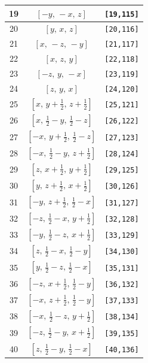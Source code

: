 \documentclass[fleqn,8pt]{jsarticle}
\begin{document}
\begin{longtable}{ccc}
19 & $\left[ - y,\, - x,\, z \right]$ & {\tt [19,115]} \\ \hline
20 & $\left[ y,\, x,\, z \right]$ & {\tt [20,116]} \\ \hline
21 & $\left[ x,\, - z,\, - y \right]$ & {\tt [21,117]} \\ \hline
22 & $\left[ x,\, z,\, y \right]$ & {\tt [22,118]} \\ \hline
23 & $\left[ - z,\, y,\, - x \right]$ & {\tt [23,119]} \\ \hline
24 & $\left[ z,\, y,\, x \right]$ & {\tt [24,120]} \\ \hline
25 & $\left[ x,\, y + \frac{1}{2},\, z + \frac{1}{2} \right]$ & {\tt [25,121]} \\ \hline
26 & $\left[ x,\, \frac{1}{2} - y,\, \frac{1}{2} - z \right]$ & {\tt [26,122]} \\ \hline
27 & $\left[ - x,\, y + \frac{1}{2},\, \frac{1}{2} - z \right]$ & {\tt [27,123]} \\ \hline
28 & $\left[ - x,\, \frac{1}{2} - y,\, z + \frac{1}{2} \right]$ & {\tt [28,124]} \\ \hline
29 & $\left[ z,\, x + \frac{1}{2},\, y + \frac{1}{2} \right]$ & {\tt [29,125]} \\ \hline
30 & $\left[ y,\, z + \frac{1}{2},\, x + \frac{1}{2} \right]$ & {\tt [30,126]} \\ \hline
31 & $\left[ - y,\, z + \frac{1}{2},\, \frac{1}{2} - x \right]$ & {\tt [31,127]} \\ \hline
32 & $\left[ - z,\, \frac{1}{2} - x,\, y + \frac{1}{2} \right]$ & {\tt [32,128]} \\ \hline
33 & $\left[ - y,\, \frac{1}{2} - z,\, x + \frac{1}{2} \right]$ & {\tt [33,129]} \\ \hline
34 & $\left[ z,\, \frac{1}{2} - x,\, \frac{1}{2} - y \right]$ & {\tt [34,130]} \\ \hline
35 & $\left[ y,\, \frac{1}{2} - z,\, \frac{1}{2} - x \right]$ & {\tt [35,131]} \\ \hline
36 & $\left[ - z,\, x + \frac{1}{2},\, \frac{1}{2} - y \right]$ & {\tt [36,132]} \\ \hline
37 & $\left[ - x,\, z + \frac{1}{2},\, \frac{1}{2} - y \right]$ & {\tt [37,133]} \\ \hline
38 & $\left[ - x,\, \frac{1}{2} - z,\, y + \frac{1}{2} \right]$ & {\tt [38,134]} \\ \hline
39 & $\left[ - z,\, \frac{1}{2} - y,\, x + \frac{1}{2} \right]$ & {\tt [39,135]} \\ \hline
40 & $\left[ z,\, \frac{1}{2} - y,\, \frac{1}{2} - x \right]$ & {\tt [40,136]} \\ \hline

\end{longtable}
\end{document}
